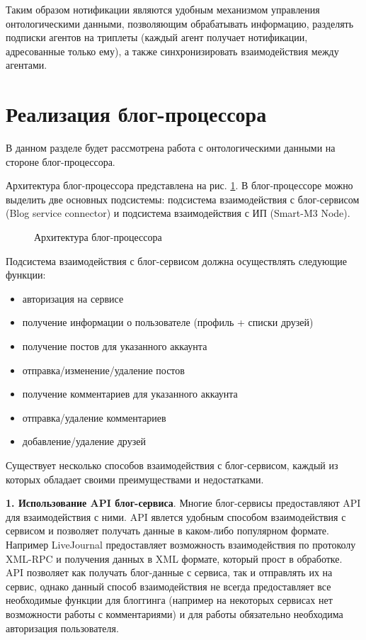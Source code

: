 Таким образом нотификации являются удобным механизмом управления онтологическими данными, позволяющим обрабатывать информацию, разделять подписки агентов на триплеты (каждый агент получает нотификации, адресованные только ему), а также синхронизировать взаимодействия между агентами.

\section{Реализация блог-процессора}

В данном разделе будет рассмотрена работа с онтологическими данными на стороне блог-процессора.

Архитектура блог-процессора представлена на рис. \ref{arch-bp}. В блог-процессоре можно выделить две основных подсистемы: подсистема взаимодействия с блог-сервисом (Blog service connector) и подсистема взаимодействия с ИП (Smart-M3 Node).

\begin{figure}[h]
\centerline{
}
\caption{Архитектура блог-процессора}
\label{arch-bp}
\end{figure}

Подсистема взаимодействия с блог-сервисом должна осуществлять следующие функции:
\begin{itemize}
\item авторизация на сервисе
\item получение информации о пользователе (профиль + списки друзей)
\item получение постов для указанного аккаунта
\item отправка/изменение/удаление постов
\item получение комментариев для указанного аккаунта
\item отправка/удаление комментариев
\item добавление/удаление друзей
\end{itemize}

Существует несколько способов взаимодействия с блог-сервисом, каждый из которых обладает своими преимуществами и недостатками.

{\bf 1. Использование API блог-сервиса}.
Многие блог-сервисы предоставляют API для взаимодействия с ними. API явлется удобным способом взаимодействия с сервисом и позволяет получать данные в каком-либо популярном формате. Например LiveJournal предоставляет возможность взаимодействия по протоколу XML-RPC и получения данных в XML формате, который прост в обработке. API позволяет как получать блог-данные с сервиса, так и отправлять их на сервис, однако данный способ взаимодействия не всегда предоставляет все необходимые функции для блоггинга (например на некоторых сервисах нет возможности работы с комментариями) и для работы обязательно необходима авторизация пользователя.

